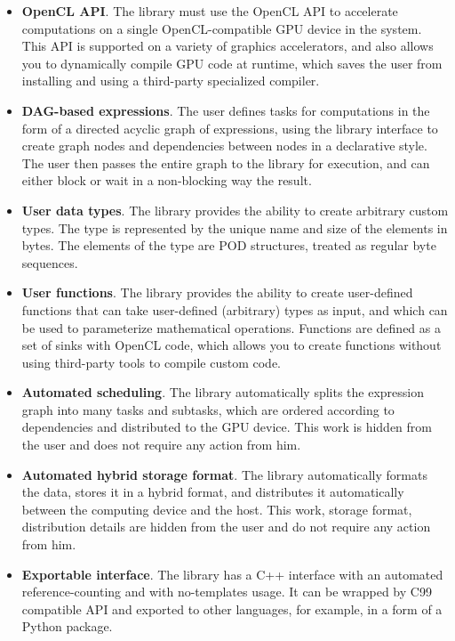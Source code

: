 \begin{itemize}
    \item \textbf{OpenCL API}. The library must use the OpenCL API to accelerate computations on a single OpenCL-compatible GPU device in the system. This API is supported on a variety of graphics accelerators, and also allows you to dynamically compile GPU code at runtime, which saves the user from installing and using a third-party specialized compiler.

    \item \textbf{DAG-based expressions}. The user defines tasks for computations in the form of a directed acyclic graph of expressions, using the library interface to create graph nodes and dependencies between nodes in a declarative style. The user then passes the entire graph to the library for execution, and can either block or wait in a non-blocking way the result.
    
    \item \textbf{User data types}. The library provides the ability to create arbitrary custom types. The type is represented by the unique name and size of the elements in bytes. The elements of the type are POD structures, treated as regular byte sequences.
    
    \item \textbf{User functions}. The library provides the ability to create user-defined functions that can take user-defined (arbitrary) types as input, and which can be used to parameterize mathematical operations. Functions are defined as a set of sinks with OpenCL code, which allows you to create functions without using third-party tools to compile custom code.
    
    \item \textbf{Automated scheduling}. The library automatically splits the expression graph into many tasks and subtasks, which are ordered according to dependencies and distributed to the GPU device. This work is hidden from the user and does not require any action from him.
    
    \item \textbf{Automated hybrid storage format}. The library automatically formats the data, stores it in a hybrid format, and distributes it automatically between the computing device and the host. This work, storage format, distribution details are hidden from the user and do not require any action from him.
    
    \item \textbf{Exportable interface}. The library has a C++ interface with an automated reference-counting and with no-templates usage. It can be wrapped by C99 compatible API and exported to other languages, for example, in a form of a Python package.
\end{itemize}


